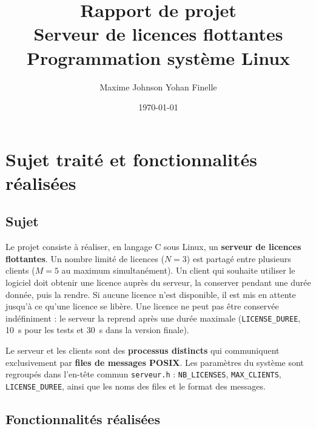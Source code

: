 \documentclass[11pt,a4paper]{article}
\title{\textbf{Rapport de projet}\\[0.4em] Serveur de licences flottantes\\[0.4em]
\large Programmation système Linux}
\author{Maxime Johnson Yohan Finelle }
\date{\today}
\newcommand{\code}[1]{\texttt{#1}}
\begin{document}
\maketitle
\tableofcontents
\newpage

\section{Sujet traité et fonctionnalités réalisées}

\subsection{Sujet}

Le projet consiste à réaliser, en langage C sous Linux, un \textbf{serveur de licences flottantes}. Un nombre limité de licences ($N=3$) est partagé entre plusieurs clients ($M=5$ au maximum simultanément). Un client qui souhaite utiliser le logiciel doit obtenir une licence auprès du serveur, la conserver pendant une durée donnée, puis la rendre. Si aucune licence n'est disponible, il est mis en attente jusqu'à ce qu'une licence se libère. Une licence ne peut pas être conservée indéfiniment : le serveur la reprend après une durée maximale (\code{LICENSE\_DUREE}, 10~s pour les tests et 30~s dans la version finale).

Le serveur et les clients sont des \textbf{processus distincts} qui communiquent exclusivement par \textbf{files de messages POSIX}. Les paramètres du système sont regroupés dans l'en-tête commun \code{serveur.h} : \code{NB\_LICENSES}, \code{MAX\_CLIENTS}, \code{LICENSE\_DUREE}, ainsi que les noms des files et le format des messages.

\subsection{Fonctionnalités réalisées}
\end{document}
